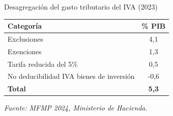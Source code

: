 \begin{frame}{Desagregación del gasto tributario del IVA (2023)}
\begin{table}[h]
\centering
\begin{tabular}{|l|c|}
\hline
\textbf{Categoría} & \textbf{\% PIB} \\
\hline
Exclusiones & 4,1 \\
Exenciones & 1,3 \\
Tarifa reducida del 5\% & 0,5 \\
No deducibilidad IVA bienes de inversión & -0,6 \\
\hline
\textbf{Total} & \textbf{5,3} \\
\hline
\end{tabular}
\vspace{0.1cm}
\par \footnotesize{\textit{Fuente: MFMP 2024, Ministerio de Hacienda.}}
\end{table}
\end{frame}
